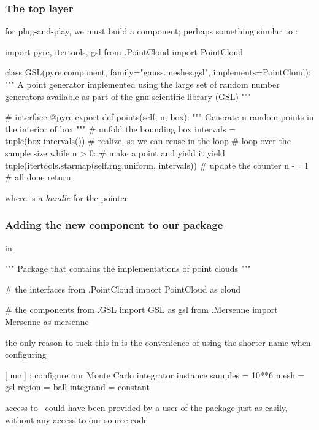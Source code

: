 \begin{frame}[fragile]
%
  \frametitle{The top layer}
%
  for plug-and-play, we must build a component; perhaps something similar to :
%
  \begin{ipython}[basicstyle=\tt\tiny]{}
import pyre, itertools, gsl
from .PointCloud import PointCloud

class GSL(pyre.component, family="gauss.meshes.gsl", implements=PointCloud):
    """
    A point generator implemented using the large set of random number
    generators available as part of the gnu scientific library (GSL)
    """

    # interface
    @pyre.export
    def points(self, n, box):
        """
        Generate {n} random points in the interior of {box}
        """
        # unfold the bounding box
        intervals = tuple(box.intervals()) # realize, so we can reuse in the loop
        # loop over the sample size
        while n > 0:
            # make a point and yield it
            yield tuple(itertools.starmap(self.rng.uniform, intervals))
            # update the counter
            n -= 1
        # all done
        return
  \end{ipython}
%
  where  is a \emph{handle} for the  pointer
%
\end{frame}

\begin{frame}[fragile]
%
  \frametitle{Adding the new component to our package}
%
  in 
%
  \begin{ipython}[firstnumber=9]{}
"""
Package that contains the implementations of point clouds
"""

# the interfaces
from .PointCloud import PointCloud as cloud

# the components
from .GSL import GSL as gsl
from .Mersenne import Mersenne as mersenne
  \end{ipython}
%
  the only reason to tuck this in  is the convenience of using the
  shorter name when configuring
%
  \begin{icfg}{}
[ mc ] ; configure our Monte Carlo integrator instance
samples = 10**6
mesh = gsl
region = ball
integrand = constant
  \end{icfg}{}
%
  access to \GSL\ could have been provided by a user of the  package just as
  easily, without any access to our source code
%
\end{frame}

